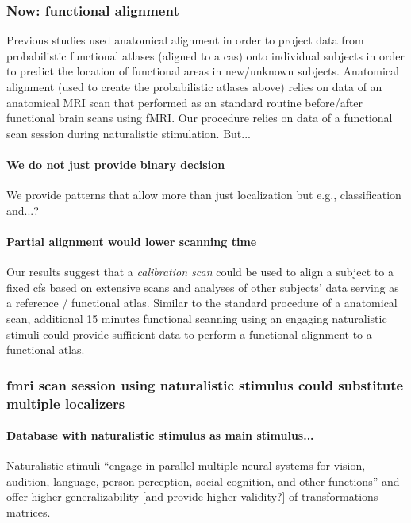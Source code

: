 \subsubsection{Now: functional alignment}
%
Previous studies used anatomical alignment in order to project data from
probabilistic functional atlases (aligned to a \ac{cas}) onto individual
subjects in order to predict the location of functional areas in new/unknown
subjects.
%
Anatomical alignment (used to create the probabilistic atlases above) relies on
data of an anatomical MRI scan that performed as an standard routine
before/after functional brain scans using fMRI.
%
Our procedure relies on data of a functional scan session during naturalistic
stimulation.
%
But...


\paragraph{We do not just provide binary decision}


%
We provide patterns that allow more than just localization but e.g.,
classification and...?


\paragraph{Partial alignment would lower scanning time}
%
Our results suggest that a \textit{calibration scan} could be used to align a
subject to a fixed \ac{cfs} based on extensive scans and analyses of other
subjects' data serving as a reference / functional atlas.
%
Similar to the standard procedure of a anatomical scan, additional 15 minutes
functional scanning using an engaging naturalistic stimuli could provide
sufficient data to perform a functional alignment to a functional atlas.

\subsubsection{\ac{fmri} scan session using naturalistic stimulus could
substitute multiple localizers}


\paragraph{Database with naturalistic stimulus as main stimulus...}
%
Naturalistic stimuli ``engage in parallel multiple neural systems for vision,
audition, language, person perception, social cognition, and other functions''
\citep{jiahui2020predicting} and offer higher generalizability [and provide
higher validity?] of transformations matrices.

